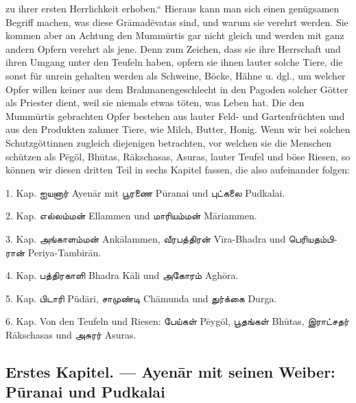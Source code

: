 \documentclass{article}
\newcommand{\TamilText}[1]{\texttamil{#1}}
\newcommand{\tam}[1]{\TamilText{#1}}
\begin{document}
zu ihrer ersten Herrlichkeit erhoben.“ Hieraus kann man sich einen genügsamen Begriff machen, was diese Gr\={a}mad\={e}vatas sind, und warum sie verehrt werden. Sie kommen aber an Achtung den Mumm\={u}rtis gar nicht gleich und werden mit ganz andern Opfern verehrt als jene. Denn zum Zeichen, dass sie ihre Herrschaft und ihren Umgang unter den Teufeln haben, opfern sie ihnen lauter solche Tiere, die sonst für unrein gehalten werden als Schweine, Böcke, Hähne u. dgl., um welcher Opfer willen keiner aus dem Brahmanengeschlecht in den Pagoden solcher Götter als Priester dient, weil sie niemals etwas töten, was Leben hat. Die den Mumm\={u}rtis gebrachten Opfer bestehen aus lauter Feld- und Gartenfrüchten und aus den Produkten zahmer Tiere, wie Milch, Butter, Honig. Wenn wir bei solchen Schutzgöttinnen zugleich diejenigen betrachten, vor welchen sie die Menschen schützen als P\={e}göl, Bh\={u}tas, R\={a}kschasas, Asuras, lauter Teufel und böse Riesen, so können wir diesen dritten Teil in sechs Kapitel fassen, die also aufeinander folgen:

1. Kap. \tam{ஐயனார்} Ayen\={a}r mit \tam{பூரணை} P\={u}ranai und \tam{புட்கலை} Pudkalai.

2. Kap. \tam{எல்லம்மன்} Ellammen und \tam{மாரியம்மன்} M\={a}riammen.

3. Kap. \tam{அங்காளம்மன்} Ank\={a}lammen, \tam{வீரபத்திரன்} V\={i}ra-Bhadra und \tam{பெரியதம்பிரான்} Periya-Tambir\={a}n.

4. Kap. \tam{பத்திரகாளி} Bhadra K\={a}li und \tam{அகோரம்} Agh\={o}ra.

5. Kap. \tam{பிடாரி} Püd\={a}ri, \tam{சாமுண்டி} Ch\={a}munda und \tam{துர்க்கை} Durga.

6. Kap. Von den Teufeln und Riesen: \tam{பேய்கள்} P\={e}ygöl, \tam{பூதங்கள்} Bh\={u}tas, \tam{இராட்சதர்} R\={a}kschasas und \tam{அசுரர்} Asuras.

\clearpage
\subsection{Erstes Kapitel. — Ayen\={a}r mit seinen Weiber: P\={u}ranai und Pudkalai}
\end{document}
